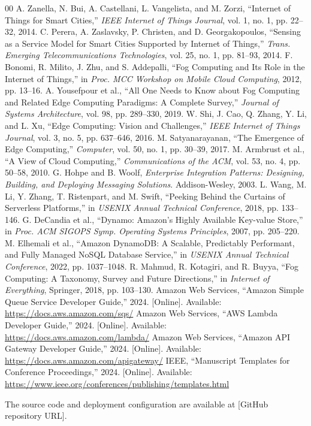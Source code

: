 \documentclass[conference]{IEEEtran}
\begin{document}
\begin{thebibliography}{00}
 A. Zanella, N. Bui, A. Castellani, L. Vangelista, and M. Zorzi, ``Internet of Things for Smart Cities,'' \emph{IEEE Internet of Things Journal}, vol. 1, no. 1, pp. 22--32, 2014.
 C. Perera, A. Zaslavsky, P. Christen, and D. Georgakopoulos, ``Sensing as a Service Model for Smart Cities Supported by Internet of Things,'' \emph{Trans. Emerging Telecommunications Technologies}, vol. 25, no. 1, pp. 81--93, 2014.
 F. Bonomi, R. Milito, J. Zhu, and S. Addepalli, ``Fog Computing and Its Role in the Internet of Things,'' in \emph{Proc. MCC Workshop on Mobile Cloud Computing}, 2012, pp. 13--16.
 A. Yousefpour et al., ``All One Needs to Know about Fog Computing and Related Edge Computing Paradigms: A Complete Survey,'' \emph{Journal of Systems Architecture}, vol. 98, pp. 289--330, 2019.
 W. Shi, J. Cao, Q. Zhang, Y. Li, and L. Xu, ``Edge Computing: Vision and Challenges,'' \emph{IEEE Internet of Things Journal}, vol. 3, no. 5, pp. 637--646, 2016.
 M. Satyanarayanan, ``The Emergence of Edge Computing,'' \emph{Computer}, vol. 50, no. 1, pp. 30--39, 2017.
 M. Armbrust et al., ``A View of Cloud Computing,'' \emph{Communications of the ACM}, vol. 53, no. 4, pp. 50--58, 2010.
 G. Hohpe and B. Woolf, \emph{Enterprise Integration Patterns: Designing, Building, and Deploying Messaging Solutions}. Addison-Wesley, 2003.
 L. Wang, M. Li, Y. Zhang, T. Ristenpart, and M. Swift, ``Peeking Behind the Curtains of Serverless Platforms,'' in \emph{USENIX Annual Technical Conference}, 2018, pp. 133--146.
 G. DeCandia et al., ``Dynamo: Amazon's Highly Available Key-value Store,'' in \emph{Proc. ACM SIGOPS Symp. Operating Systems Principles}, 2007, pp. 205--220.
 M. Elhemali et al., ``Amazon DynamoDB: A Scalable, Predictably Performant, and Fully Managed NoSQL Database Service,'' in \emph{USENIX Annual Technical Conference}, 2022, pp. 1037--1048.
 R. Mahmud, R. Kotagiri, and R. Buyya, ``Fog Computing: A Taxonomy, Survey and Future Directions,'' in \emph{Internet of Everything}, Springer, 2018, pp. 103--130.
 Amazon Web Services, ``Amazon Simple Queue Service Developer Guide,'' 2024. [Online]. Available: \url{https://docs.aws.amazon.com/sqs/}
 Amazon Web Services, ``AWS Lambda Developer Guide,'' 2024. [Online]. Available: \url{https://docs.aws.amazon.com/lambda/}
 Amazon Web Services, ``Amazon API Gateway Developer Guide,'' 2024. [Online]. Available: \url{https://docs.aws.amazon.com/apigateway/}
 IEEE, ``Manuscript Templates for Conference Proceedings,'' 2024. [Online]. Available: \url{https://www.ieee.org/conferences/publishing/templates.html}
\end{thebibliography}

The source code and deployment configuration are available at [GitHub repository URL].
\end{document}
